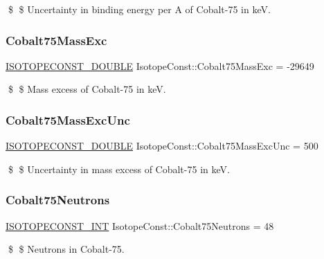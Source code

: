 \$ \$ Uncertainty in binding energy per A of Cobalt-\/75 in keV. \mbox{\label{group___isotope_const-_cobalt-_co75_ga375728bf8e9d2c1c0f57347d2ba2bce0}} 
\subsubsection{\texorpdfstring{Cobalt75\+Mass\+Exc}{Cobalt75MassExc}}
{\footnotesize\ttfamily \mbox{\hyperlink{group___isotope_const-_macros_ga8f45a7272ce02c0b4c65c44636ed719a}{I\+S\+O\+T\+O\+P\+E\+C\+O\+N\+S\+T\+\_\+\+D\+O\+U\+B\+LE}} Isotope\+Const\+::\+Cobalt75\+Mass\+Exc = -\/29649}

\$ \$ Mass excess of Cobalt-\/75 in keV. \mbox{\label{group___isotope_const-_cobalt-_co75_gad4e162263a7ac383a44ffe83af5386a3}} 
\subsubsection{\texorpdfstring{Cobalt75\+Mass\+Exc\+Unc}{Cobalt75MassExcUnc}}
{\footnotesize\ttfamily \mbox{\hyperlink{group___isotope_const-_macros_ga8f45a7272ce02c0b4c65c44636ed719a}{I\+S\+O\+T\+O\+P\+E\+C\+O\+N\+S\+T\+\_\+\+D\+O\+U\+B\+LE}} Isotope\+Const\+::\+Cobalt75\+Mass\+Exc\+Unc = 500}

\$ \$ Uncertainty in mass excess of Cobalt-\/75 in keV. \mbox{\label{group___isotope_const-_cobalt-_co75_ga1c6d3fbb58693e3a82e21b3ef05ab19c}} 
\subsubsection{\texorpdfstring{Cobalt75\+Neutrons}{Cobalt75Neutrons}}
{\footnotesize\ttfamily \mbox{\hyperlink{group___isotope_const-_macros_ga5f18360b3e99483a35c32d789e62621c}{I\+S\+O\+T\+O\+P\+E\+C\+O\+N\+S\+T\+\_\+\+I\+NT}} Isotope\+Const\+::\+Cobalt75\+Neutrons = 48}

\$ \$ Neutrons in Cobalt-\/75. \mbox{\label{group___isotope_const-_cobalt-_co75_ga30b5a92b59a27b540ed3b08f3eaf93f5}} 
